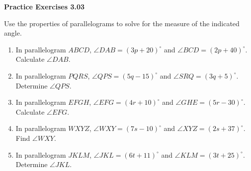 \vspace{0.3ex}
\noindent\textbf{Practice Exercises 3.03}

\vspace{0.2ex}

\noindent Use the properties of parallelograms to solve for the measure of the indicated angle.

\begin{enumerate}[label=\color{blue}\arabic*.]
    \item In parallelogram \(ABCD\), \(\angle DAB = (3p + 20)^\circ\) and \(\angle BCD = (2p + 40)^\circ\). Calculate \(\angle DAB\).
    \item In parallelogram \(PQRS\), \(\angle QPS = (5q - 15)^\circ\) and \(\angle SRQ = (3q + 5)^\circ\). Determine \(\angle QPS\).
    \item In parallelogram \(EFGH\), \(\angle EFG = (4r + 10)^\circ\) and \(\angle GHE = (5r - 30)^\circ\). Calculate \(\angle EFG\).
    \item In parallelogram \(WXYZ\), \(\angle WXY = (7s - 10)^\circ\) and \(\angle XYZ = (2s + 37)^\circ\). Find \(\angle WXY\).
    \item In parallelogram \(JKLM\), \(\angle JKL = (6t + 11)^\circ\) and \(\angle KLM = (3t + 25)^\circ\). Determine \(\angle JKL\).
\end{enumerate}
